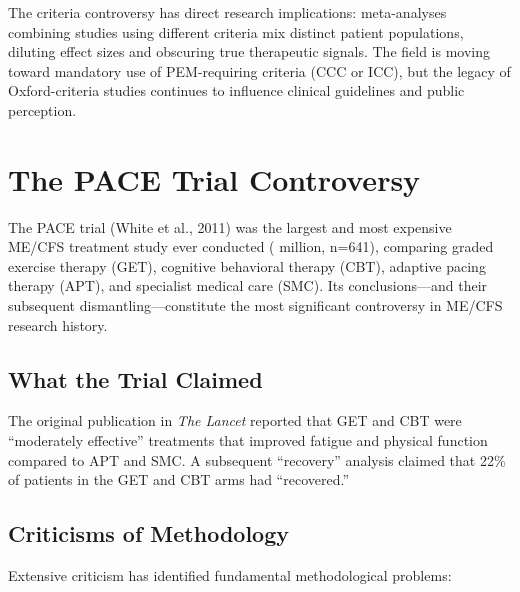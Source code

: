 The criteria controversy has direct research implications: meta-analyses combining studies using different criteria mix distinct patient populations, diluting effect sizes and obscuring true therapeutic signals. The field is moving toward mandatory use of PEM-requiring criteria (CCC or ICC), but the legacy of Oxford-criteria studies continues to influence clinical guidelines and public perception.

\section{The PACE Trial Controversy}
\label{sec:pace-controversy}

The PACE trial (White et al., 2011) was the largest and most expensive ME/CFS treatment study ever conducted ( million, n=641), comparing graded exercise therapy (GET), cognitive behavioral therapy (CBT), adaptive pacing therapy (APT), and specialist medical care (SMC). Its conclusions---and their subsequent dismantling---constitute the most significant controversy in ME/CFS research history.

\subsection{What the Trial Claimed}

The original publication in \textit{The Lancet} reported that GET and CBT were ``moderately effective'' treatments that improved fatigue and physical function compared to APT and SMC. A subsequent ``recovery'' analysis claimed that 22\% of patients in the GET and CBT arms had ``recovered.''

\subsection{Criticisms of Methodology}

Extensive criticism has identified fundamental methodological problems:

